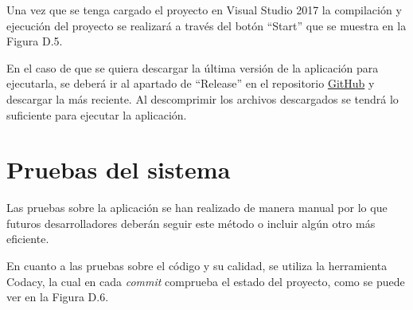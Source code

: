 Una vez que se tenga cargado el proyecto en Visual Studio 2017 la compilación y ejecución del proyecto se realizará a través del botón ``Start'' que se muestra en la Figura D.5.


En el caso de que se quiera descargar la última versión de la aplicación para ejecutarla, se deberá ir al apartado de ``Release'' en el repositorio \href{https://github.com/FranBurgos/TFG/releases}{GitHub} y descargar la más reciente. Al descomprimir los archivos descargados se tendrá lo suficiente para ejecutar la aplicación.

\section{Pruebas del sistema}

Las pruebas sobre la aplicación se han realizado de manera manual por lo que futuros desarrolladores deberán seguir este método o incluir algún otro más eficiente.

En cuanto a las pruebas sobre el código y su calidad, se utiliza la herramienta Codacy, la cual en cada \textit{commit} comprueba el estado del proyecto, como se puede ver en la Figura D.6.

